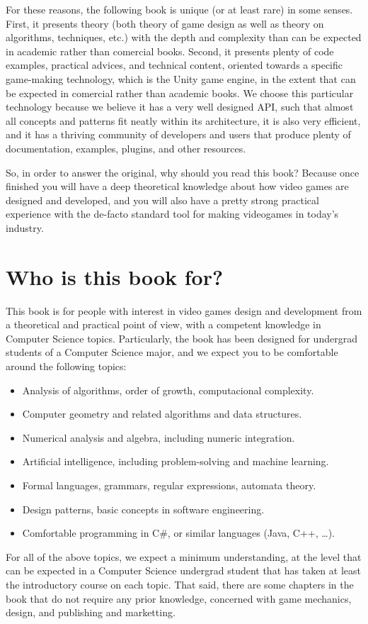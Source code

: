 For these reasons, the following book is unique (or at least rare) in some senses. First,
it presents theory (both theory of game design as well as theory on algorithms, techniques, etc.)
with the depth and complexity than can be expected in academic rather than comercial books.
Second, it presents plenty of code examples, practical advices, and technical content, oriented
towards a specific game-making technology, which is the Unity game engine, in the extent that
can be expected in comercial rather than academic books. We choose this
particular technology because we believe it has a very well designed API, such that almost all
concepts and patterns fit neatly within its architecture, it is also very efficient, and it has
a thriving community of developers and users that produce plenty of documentation, examples, plugins, and
other resources.

So, in order to answer the original, why should you read this book? Because once finished you will
have a deep theoretical knowledge about how video games are designed and developed, and you will
also have a pretty strong practical experience with the de-facto standard tool for making videogames
in today's industry.

\section*{Who is this book for?}

This book is for people with interest in video games design and development from a theoretical
and practical point of view, with a competent knowledge in Computer Science topics. Particularly,
the book has been designed for undergrad students of a Computer Science major, and we expect you
to be comfortable around the following topics:

\begin{itemize}
	\item Analysis of algorithms, order of growth, computacional complexity.
	\item Computer geometry and related algorithms and data structures.
	\item Numerical analysis and algebra, including numeric integration.
	\item Artificial intelligence, including problem-solving and machine learning.
	\item Formal languages, grammars, regular expressions, automata theory.
	\item Design patterns, basic concepts in software engineering.
	\item Comfortable programming in C\#, or similar languages (Java, C++, \ldots).
\end{itemize}

For all of the above topics, we expect a minimum understanding, at the level that can
be expected in a Computer Science undergrad student that has taken at least the introductory
course on each topic.
That said, there are some chapters in the book that do not require any prior knowledge, concerned
with game mechanics, design, and publishing and marketting.
